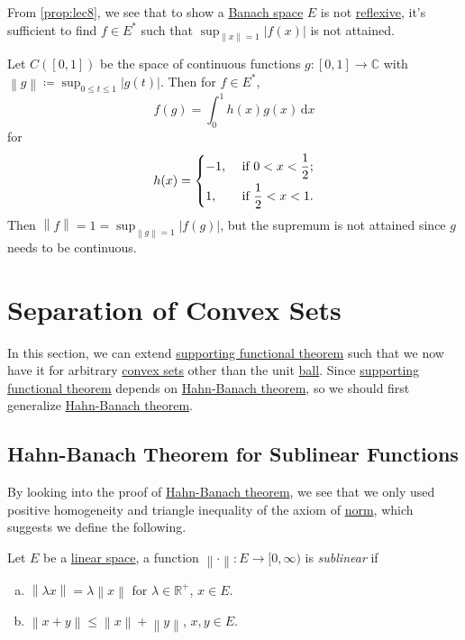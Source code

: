 From \autoref{prop:lec8}, we see that to show a \hyperref[def:Banach-space]{Banach space} \(E\) is not \hyperref[def:reflexive-space]{reflexive}, it's sufficient to find \(f\in E^{\ast} \) such that \(\sup _{\left\lVert x\right\rVert = 1}\left\vert f(x) \right\vert \) is not attained.

\begin{eg}
	Let \(C([0, 1])\) be the space of continuous functions \(g\colon [0, 1]\to \mathbb{C}\) with \(\left\lVert g\right\rVert \coloneqq \sup _{0 \leq t\leq 1} \left\vert g(t) \right\vert \). Then for \(f\in E^{\ast} \),
	\[
		f(g) = \int _0 ^1 h(x)g(x)\,\mathrm{d} x
	\]
	for
	\[
		h(x) = \begin{dcases}
			-1, & \text{ if } 0 < x < \frac{1}{2}; \\
			1,  & \text{ if } \frac{1}{2} < x < 1.
		\end{dcases}
	\]
	Then \(\left\lVert f\right\rVert = 1 = \sup _{\left\lVert g\right\rVert = 1}\left\vert f(g) \right\vert \), but the supremum is not attained since \(g\) needs to be continuous.
\end{eg}

\section{Separation of Convex Sets}
In this section, we can extend \hyperref[thm:supporting-functional]{supporting functional theorem} such that we now have it for arbitrary \hyperref[def:convex-set]{convex sets} other than the unit \hyperref[def:ball]{ball}. Since \hyperref[thm:supporting-functional]{supporting functional theorem} depends on \hyperref[thm:Hahn-Banach]{Hahn-Banach theorem}, so we should first generalize \hyperref[thm:Hahn-Banach]{Hahn-Banach theorem}.

\subsection{Hahn-Banach Theorem for Sublinear Functions}
By looking into the proof of \hyperref[thm:Hahn-Banach]{Hahn-Banach theorem}, we see that we only used positive homogeneity and triangle inequality of the axiom of \hyperref[def:norm]{norm}, which suggests we define the following.

\begin{definition}[Sublinear]\label{def:sublinear}
	Let \(E\) be a \hyperref[def:linear-vector-space]{linear space}, a function \(\left\lVert \cdot\right\rVert \colon E \to [0, \infty )\) is \emph{sublinear} if
	\begin{enumerate}[(a)]
		\item \(\left\lVert \lambda x\right\rVert = \lambda \left\lVert x\right\rVert \) for \(\lambda \in \mathbb{R}^+ \), \(x\in E\).
		\item \(\left\lVert x + y\right\rVert \leq \left\lVert x\right\rVert + \left\lVert y\right\rVert\), \(x, y\in E\).
	\end{enumerate}
\end{definition}


